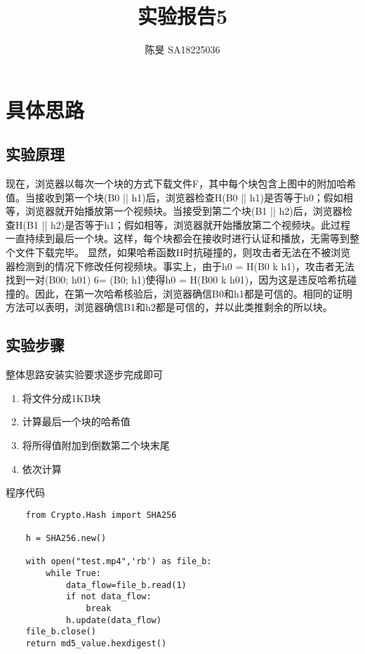 \documentclass[UTF8]{article}
\title{实验报告5}
\author{陈旻 SA18225036}
\date{}
\begin{document}
\maketitle
\section{具体思路}
\paragraph{}
\subsection{实验原理}
现在，浏览器以每次一个块的方式下载文件F，其中每个块包含上图中的附加哈希值。当接收到第一个块(B0 || h1)后，浏览器检查H(B0 || h1)是否等于h0；假如相等，浏览器就开始播放第一个视频块。当接受到第二个块(B1 || h2)后，浏览器检查H(B1 || h2)是否等于h1；假如相等，浏览器就开始播放第二个视频块。此过程一直持续到最后一个块。这样，每个块都会在接收时进行认证和播放，无需等到整个文件下载完毕。
显然，如果哈希函数H时抗碰撞的，则攻击者无法在不被浏览器检测到的情况下修改任何视频块。事实上，由于h0 = H(B0 k h1)，攻击者无法找到一对(B00; h01) 6= (B0; h1)使得h0 = H(B00 k h01)，因为这是违反哈希抗碰撞的。因此，在第一次哈希核验后，浏览器确信B0和h1都是可信的。相同的证明方法可以表明，浏览器确信B1和h2都是可信的，并以此类推剩余的所以块。
\subsection{实验步骤}
整体思路安装实验要求逐步完成即可
\begin{enumerate}
    \item 将文件分成1KB块
    \item 计算最后一个块的哈希值
    \item 将所得值附加到倒数第二个块末尾
    \item 依次计算
\end{enumerate}
程序代码
\begin{lstlisting}
    from Crypto.Hash import SHA256

    h = SHA256.new()

    with open("test.mp4",'rb') as file_b:
        while True:
            data_flow=file_b.read(1)     
            if not data_flow:                
                break
            h.update(data_flow)
    file_b.close()
    return md5_value.hexdigest()
\end{lstlisting}
\end{document}

